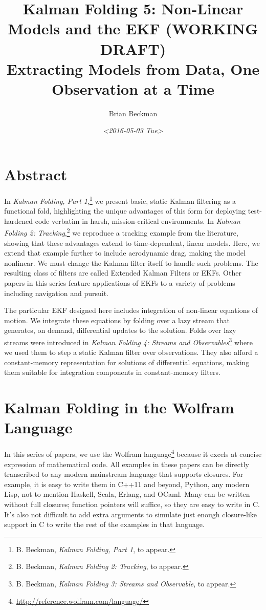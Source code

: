 \documentclass[10pt,oneside,x11names]{article}
\author{Brian Beckman}
\date{\textit{<2016-05-03 Tue>}}
\title{Kalman Folding 5: Non-Linear Models and the EKF (WORKING DRAFT)\\\medskip
\large Extracting Models from Data, One Observation at a Time}
\begin{document}
\maketitle
\setcounter{tocdepth}{2}
\tableofcontents


\section{Abstract}
\label{sec:orgheadline1}

In \emph{Kalman Folding, Part 1},\footnote{B. Beckman, \emph{Kalman Folding, Part 1}, to appear.} we present basic, static Kalman filtering
as a functional fold, highlighting the unique advantages of this form for
deploying test-hardened code verbatim in harsh, mission-critical environments.
In \emph{Kalman Folding 2: Tracking},\footnote{B. Beckman, \emph{Kalman Folding 2: Tracking}, to appear.} we reproduce a tracking example from
the literature, showing that these advantages extend to time-dependent, linear
models. Here, we extend that example further to include aerodynamic drag, making the
model nonlinear. We must change the Kalman filter itself to handle such
problems. The resulting class of filters are called Extended Kalman Filters or
EKFs. Other papers in this series feature applications of EKFs to a variety of
problems including navigation and pursuit.

The particular EKF designed here includes integration of non-linear equations of
motion. We integrate these equations by folding over a lazy stream that
generates, on demand, differential updates to the solution. Folds over lazy
streams were introduced in \emph{Kalman Folding 4: Streams and Observables}\footnote{B. Beckman, \emph{Kalman Folding 3: Streams and Observable}, to appear.}
where we used them to step a static Kalman filter over observations. They also
afford a constant-memory representation for solutions of differential equations,
making them suitable for integration components in constant-memory filters.

\section{Kalman Folding in the Wolfram Language}
\label{sec:orgheadline3}

In this series of papers, we use the Wolfram language\footnote{\url{http://reference.wolfram.com/language/}} because it excels
at concise expression of mathematical code. All examples in these papers can be
directly transcribed to any modern mainstream language that supports closures.
For example, it is easy to write them in C++11 and beyond, Python, any modern
Lisp, not to mention Haskell, Scala, Erlang, and OCaml. Many can be written
without full closures; function pointers will suffice, so they are easy to write
in C. It's also not difficult to add extra arguments to simulate just enough
closure-like support in C to write the rest of the examples in that language.
\end{document}
